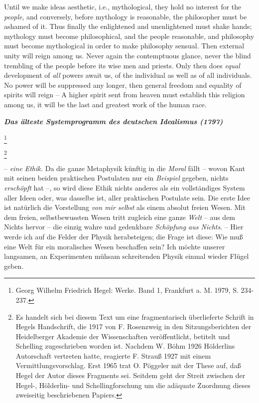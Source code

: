 \documentclass[12pt,letterpaper]{article} %
\newcommand{\mytitle}[1]{%
\newpage
\begin{center}
{\LARGE \textbf{\textit{#1}} \par}
\end{center}
\vskip 10pt
}
\newcommand\blfootnote[1]{%
  \begingroup
  \renewcommand\thefootnote{}\footnote{#1}%
  \addtocounter{footnote}{-1}%
  \endgroup
}
\begin{document}
Until we make ideas aesthetic, i.e., mythological, they hold no interest for the \textit{people},
and conversely, before mythology is reasonable, the philosopher must be ashamed of it. Thus
finally the enlightened and unenlightened must shake hands; mythology must become
philosophical, and the people reasonable, and philosophy must become mythological in order
to make philosophy sensual. Then external unity will reign among us. Never again the
contemptuous glance, never the blind trembling of the people before its wise men and priests.
Only then does \textit{equal} development of \textit{all} powers await us, of the individual as well as of all
individuals. No power will be suppressed any longer, then general freedom and equality of
spirits will reign -- A higher spirit sent from heaven must establish this religion among us, it
will be the last and greatest work of the human race.


\newpage %


\mytitle{\textbf{\textit{\large Das älteste Systemprogramm des deutschen Idealismus (1797)}}}

\blfootnote{Georg Wilhelm Friedrich Hegel: Werke. Band 1, Frankfurt a. M. 1979, S. 234-237.}
\blfootnote{Es handelt sich bei diesem Text um eine fragmentarisch überlieferte Schrift in Hegels Handschrift, die 1917 von F. Rosenzweig in den Sitzungsberichten der Heidelberger Akademie der Wissenschaften veröffentlicht, betitelt und Schelling zugeschrieben worden ist. Nachdem W. Böhm 1926 Hölderlins Autorschaft vertreten hatte, reagierte F. Strauß 1927 mit einem Vermittlungsvorschlag. Erst 1965 trat O. Pöggeler mit der These auf, daß Hegel der Autor dieses Fragments sei. Seitdem geht der Streit zwischen der Hegel-, Hölderlin- und Schellingforschung um die adäquate Zuordnung dieses zweiseitig beschriebenen Papiers.
}
– \textit{eine Ethik.} Da die ganze Metaphysik künftig in die \textit{Moral} fällt – wovon Kant mit seinen beiden praktischen Postulaten nur ein \textit{Beispiel} gegeben, nichts \textit{erschöpft} hat –, so wird diese Ethik nichts anderes als ein vollständiges System aller Ideen oder, was dasselbe ist, aller praktischen Postulate sein. Die erste Idee ist natürlich die Vorstellung \textit{von mir selbst} als einem absolut freien Wesen. Mit dem freien, selbstbewussten Wesen tritt zugleich eine ganze \textit{Welt} – aus dem Nichts hervor – die einzig wahre und gedenkbare \textit{Schöpfung aus Nichts}. – Hier werde ich auf die Felder der Physik herabsteigen; die Frage ist diese: Wie muß eine Welt für ein moralisches Wesen beschaffen sein? Ich möchte unserer langsamen, an Experimenten mühsam schreitenden Physik einmal wieder Flügel geben.
\end{document}
